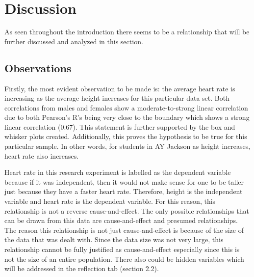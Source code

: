 \chapter{Discussion}

As seen throughout the introduction there seems to be a relationship that will be further discussed and analyzed in this section.

\section{Observations}
Firstly, the most evident observation to be made is: the average heart rate is increasing as the average height increases for this particular data set. Both correlations from males and females show a moderate-to-strong linear correlation due to both Pearson's R's  being very close to the boundary which shows a strong linear correlation (0.67). This statement is further supported by the box and whisker plots created.
Additionally, this proves the hypothesis to be true for this particular sample. In other words, for students in AY Jackson as height increases, heart rate also increases. 
\vspace{0.3cm}

Heart rate in this research experiment is labelled as the dependent variable because if it was independent, then it would not make sense for one to be taller just because they have a faster heart rate. Therefore, height is the independent variable and heart rate is the dependent variable. For this reason, this relationship is not a reverse cause-and-effect. The only possible relationships that can be drawn from this data are cause-and-effect and presumed relationships. The reason this relationship is not just cause-and-effect is because of the size of the data that was dealt with. Since the data size was not very large, this relationship cannot be fully justified as cause-and-effect especially since this is not the size of an entire population. There also could be hidden variables which will be addressed in the reflection tab (section 2.2).

